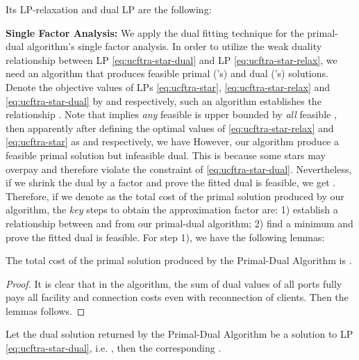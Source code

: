 \documentclass[10pt]{llncs}
\begin{document}
Its LP-relaxation and dual LP are the following:

\setlength{\columnsep}{2pt}
\begin{multicols}{2}




\columnbreak 




\end{multicols}

\textbf{Single Factor Analysis: }We apply the dual fitting technique
\cite{Jain03dualfitting} for the primal-dual algorithm's single factor
analysis. In order to utilize the weak duality relationship between
LP \eqref{eq:ucftra-star-dual} and LP \eqref{eq:ucftra-star-relax},
we need an algorithm that produces feasible primal ('s) and
dual ('s) solutions. Denote the objective values of LPs
\eqref{eq:ucftra-star}, \eqref{eq:ucftra-star-relax} and \eqref{eq:ucftra-star-dual}
by  and  respectively, such an algorithm
establishes the relationship .
Note that  implies \textit{any} feasible 
is upper bounded by \textit{all} feasible , then apparently
after defining the optimal values of \eqref{eq:ucftra-star-relax}
and \eqref{eq:ucftra-star} as  and  respectively,
we have  However, our algorithm
produce a feasible primal solution but infeasible dual. This is because
some stars may overpay  and therefore violate the constraint
of \eqref{eq:ucftra-star-dual}. Nevertheless, if we shrink the dual
by a factor  and prove the fitted dual 
is feasible, we get .
Therefore, if we denote  as the total cost of the primal
solution produced by our algorithm, the \textit{key }steps to obtain
the approximation factor are: 1) establish a relationship between
 and  from our primal-dual algorithm; 2) find
a minimum  and prove the fitted dual 
is feasible. For step 1), we have the following lemmas:
\begin{lemma}
The total cost of the primal solution  produced by the Primal-Dual
Algorithm is .
\label{lem:1}\end{lemma}
\begin{proof}
It is clear that in the algorithm, the sum of dual values of all ports
fully pays all facility and connection costs even with reconnection
of clients. Then the lemmas follows.\end{proof}
\begin{lemma}
Let the dual solution  returned by the Primal-Dual
Algorithm be a solution to LP \eqref{eq:ucftra-star-dual}, i.e. ,
then the corresponding .\label{lem:p=00003Dd}\end{lemma}
\end{document}
